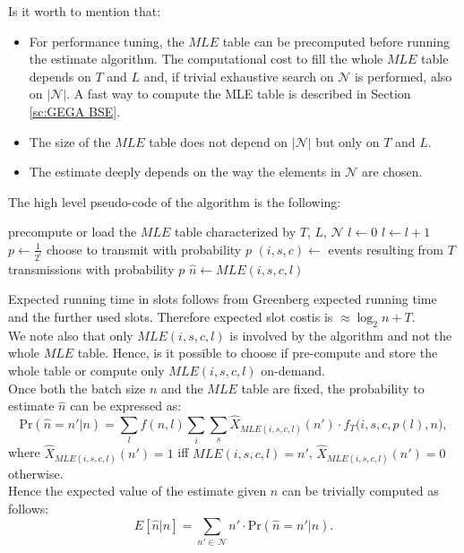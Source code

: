 \documentclass[11pt,a4paper,twoside,openright]{book}
\newcommand{\algname}[1]{\ensuremath{\mbox{\sc #1}}}
\begin{document}
Is it worth to mention that:
\begin{itemize}
\item  For performance tuning, the $MLE$ table can be precomputed before running the estimate algorithm. The computational cost to fill the whole $MLE$ table depends on $T$ and $L$ and, if trivial exhaustive search on $\mathcal{N}$ is performed, also on $|\mathcal{N}|$. A fast way to compute the MLE table is described in Section \ref{sc:GEGA BSE}.
\item The size of the $MLE$ table does not depend on $|\mathcal{N}|$ but only on $T$ and $L$.
\item The estimate deeply depends on the way the elements in $\mathcal{N}$ are chosen. \\
\end{itemize}

The high level pseudo-code of the algorithm is the following: 
\begin{algorithm}[H]
\begin{algorithmic}
\STATE precompute or load the $MLE$ table characterized by $T$, $L$, $\mathcal{N}$
\STATE $l\gets 0$
\REPEAT
	\STATE $l\gets l+1$
	\STATE $p \gets {\displaystyle\frac{1}{2^{l}}}$
	\STATE choose to transmit with probability $p$
\STATE $(i,s,c) \gets$ events resulting from $T$ transmissions with probability $p$
\STATE $\hat{n}\gets MLE(i,s,c,l)$
\end{algorithmic}
\caption{\algname{EGA $(\mathcal{B},T,\mathcal{N})$}}
\label{alg-greenberg+MLE}
\end{algorithm}
Expected running time in slots follows from Greenberg expected running time and the further used slots. Therefore expected slot costis is $\approx \log_{2}n+T$.\\ 
We note also that only $MLE(i,s,c,l)$ is involved by the algorithm and not the whole $MLE$ table. Hence, is it possible to choose if pre-compute and store the whole table or compute only $MLE(i,s,c,l)$ on-demand.\\
Once both the batch size $n$ and the $MLE$ table are fixed, the probability to estimate $\hat{n}$ can be expressed as:
\begin{equation}
\textrm{Pr}(\hat{n}=n'|n)=\sum_{l}f(n,l)\sum_{i}\sum_{s} \hat{X}_{MLE(i,s,c,l)}(n') \cdot f_{T}\big(i,s,c,p(l),n\bigl),
\end{equation}
 where  $\hat{X}_{MLE(i,s,c,l)}(n')=1$ iff $MLE(i,s,c,l)=n'$,  $\hat{X}_{MLE(i,s,c,l)}(n')=0$ otherwise. \\
Hence the expected value of the estimate given $n$ can be trivially computed as follows:
\begin{equation}
E[\hat{n}|n]=\sum_{n'\in\,\mathcal{N}}n'\cdot\textrm{Pr}(\hat{n}=n'|n).
\label{eq:EGA expected estimate given n}
\end{equation}
 
\end{document}
